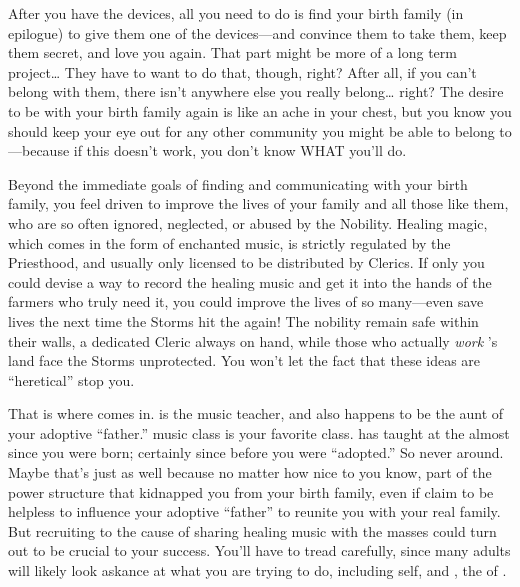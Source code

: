 \documentclass[char]{GL2020}
\begin{document}
After you have the devices, all you need to do is find your birth family (in epilogue) to give them one of the devices---and convince them to take them, keep them secret, and love you again. That part might be more of a long term project\ldots{} They have to want to do that, though, right? After all, if you can't belong with them, there isn't anywhere else you really belong\ldots{} right? The desire to be with your birth family again is like an ache in your chest, but you know you should keep your eye out for any other community you might be able to belong to---because if this doesn't work, you don't know WHAT you'll do.

Beyond the immediate goals of finding and communicating with your birth family, you feel driven to improve the lives of your family and all those like them, who are so often ignored, neglected, or abused by the Nobility. Healing magic, which comes in the form of enchanted music, is strictly regulated by the Priesthood, and usually only licensed to be distributed by Clerics. If only you could devise a way to record the healing music and get it into the hands of the farmers who truly need it, you could improve the lives of so many---even save lives the next time the Storms hit the \pFarm{} again!  The nobility remain safe within their walls, a dedicated Cleric always on hand, while those who actually \emph{work} \cFarmGod{}'s land face the Storms unprotected. You won't let the fact that these ideas are ``heretical''  stop you.

That is where \cMusic{\full} comes in. \cMusic{} is the music teacher, and also happens to be the aunt of your adoptive ``father.'' \cMusic{\Their} music class is your favorite class. \cMusic{} has taught at the \pSchool{} almost since you were born; certainly since before you were ``adopted.'' So \cMusic{\they} \cMusic{\were} never around. Maybe that's just as well because no matter how nice \cMusic{\theyare} to you know, \cMusic{\theyare} part of the power structure that kidnapped you from your birth family, even if \cMusic{\they}claim\cMusic{\plural} to be helpless to influence your adoptive ``father'' to reunite you with your real family. But recruiting \cMusic{} to the cause of sharing healing music with the masses could turn out to be crucial to your success. You'll have to tread carefully, since many adults will likely look askance at what you are trying to do, including \cMusic{} \cMusic{\them}self, and \cHedonist{}, the \cHedonist{\cleric} of \cFarmGod{}. 
\end{document}

